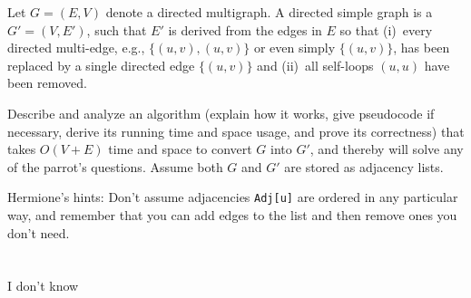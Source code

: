 \documentclass[12pt]{article}
\begin{document}
\begin{enumerate}
Let $G=(E,V)$ denote a directed multigraph. A directed simple graph is a
$G'=(V,E')$, such that $E'$ is derived from the edges in $E$ so that (i)~every
directed multi-edge, e.g., $\{(u,v),(u,v)\}$ or even simply $\{(u,v)\}$, has
been replaced by a single directed edge $\{(u,v)\}$ and (ii)~all self-loops
$(u,u)$ have been removed.\\
\pagebreak

Describe and analyze an algorithm (explain how it works, give pseudocode if
necessary, derive its running time and space usage, and prove its correctness)
that takes \mbox{$O(V+E)$} time and space to convert $G$ into $G'$, and thereby
will solve any of the parrot's questions. Assume both $G$ and $G'$ are stored
as adjacency lists.
	
Hermione's hints: Don't assume adjacencies {\tt Adj[u]} are ordered in any
particular way, and remember that you can add edges to the list and then remove
ones you don't need.\\
\\ \\ I don't know
\pagebreak

\end{enumerate}
\end{document}

